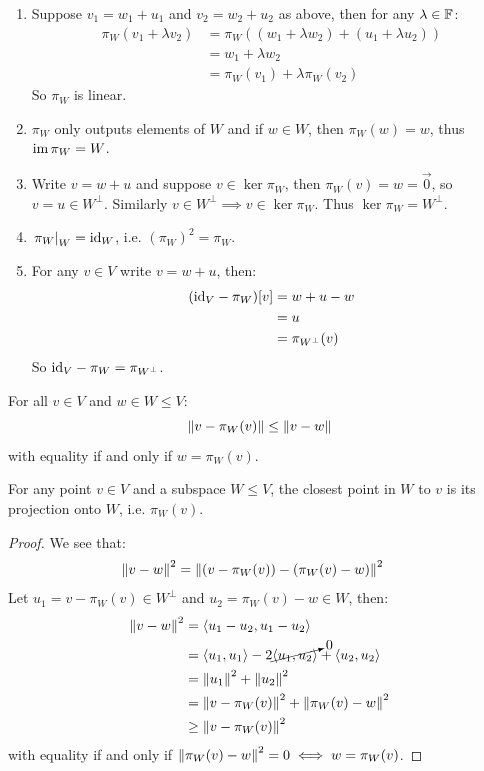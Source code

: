 \documentclass[../main.tex]{subfiles}
\begin{document}
\begin{remark}
  \begin{enumerate}
    \item Suppose $v_1 = w_1 + u_1$ and $v_2 = w_2 + u_2$ as above, then for any $\lambda \in \mathbb{F}$:
      \begin{align*}
        \pi_W(v_1 + \lambda v_2) &= \pi_W((w_1 + \lambda w_2) + (u_1 + \lambda u_2)) \\
                                 &= w_1 + \lambda w_2 \\
                                 &= \pi_W(v_1) + \lambda \pi_W(v_2)
      \end{align*}
      So $\pi_W$ is linear.
    \item $\pi_W$ only outputs elements of $W$ and if $w \in W$, then $\pi_W(w) = w$, thus $\operatorname{im} \pi_W = W$.
    \item Write $v = w + u$ and suppose $v \in \ker \pi_W$, then $\pi_W(v) = w = \vec{0}$, so $v = u \in W^{\perp}$.
      Similarly $v \in W^{\perp} \implies v \in \ker \pi_W$.
      Thus $\ker \pi_W = W^{\perp}$.
    \item $\left. \pi_{W} \right|_{W} = \mathrm{id}_W$, i.e. $(\pi_W)^2 = \pi_W$.
    \item For any $v \in V$ write $v = w + u$, then:
      \begin{align*}
        (\mathrm{id}_V - \pi_W)[v] &= w + u - w \\
                           &= u \\
                           &= \pi_{W^{\perp}}(v)
      \end{align*}
      So $\mathrm{id}_V - \pi_W = \pi_{W^{\perp}}$.
  \end{enumerate}
\end{remark}
\begin{proposition}
  For all $v \in V$ and $w \in W \leq V$:
  \[
    \left\lVert v - \pi_W(v) \right\rVert \leq \left\lVert v - w \right\rVert
  \]
  with equality if and only if $w = \pi_W(v)$.
\end{proposition}
\begin{remark}[Intuition]
  For any point $v \in V$ and a subspace $W \leq V$, the closest point in $W$ to $v$ is its projection onto $W$, i.e. $\pi_W(v)$.
\end{remark}
\begin{proof}
  We see that:
  \begin{align*}
    \left\lVert v - w \right\rVert^2 &= \left\lVert (v - \pi_{W}(v)) - (\pi_W(v) - w) \right\rVert^2
  \end{align*}
  Let $u_1 = v - \pi_W(v) \in W^{\perp}$ and $u_2 = \pi_W(v) - w \in W$, then:
  \begin{align*}
    \left\lVert v - w \right\rVert^2 &= \langle u_1 - u_2, u_1 - u_2 \rangle \\
                   &= \langle u_1, u_1 \rangle - 2\cancelto{0}{\langle u_1, u_2 \rangle} + \langle u_2, u_2 \rangle \\
                   &= \left\lVert u_1 \right\rVert^2 + \left\lVert u_2 \right\rVert^2 \\
                   &= \left\lVert v - \pi_W(v) \right\rVert^2 + \left\lVert \pi_{W}(v) - w \right\rVert^2 \\
                   &\geq \left\lVert v - \pi_W(v) \right\rVert^2
  \end{align*}
  with equality if and only if $\left\lVert \pi_W(v) - w \right\rVert^2 = 0 \iff w = \pi_{W}(v)$.
\end{proof}
\end{document}
